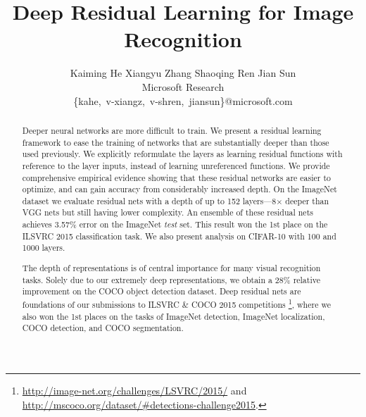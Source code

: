 \documentclass[10pt,twocolumn,letterpaper]{article}
\begin{document}
\title{Deep Residual Learning for Image Recognition}



\author{Kaiming He \qquad Xiangyu Zhang \qquad Shaoqing Ren \qquad Jian Sun \\
  \large Microsoft Research \vspace{-.2em}\\
  \normalsize
  \{kahe,~v-xiangz,~v-shren,~jiansun\}@microsoft.com
}

\maketitle

\begin{abstract}
  \vspace{-.5em}
  Deeper neural networks are more difficult to train. We present a residual learning framework to ease the training of networks that are substantially deeper than those used previously. We explicitly reformulate the layers as learning residual functions with reference to the layer inputs, instead of learning unreferenced functions. We provide comprehensive empirical evidence showing that these residual networks are easier to optimize, and can gain accuracy from considerably increased depth.
  On the ImageNet dataset we evaluate residual nets with a depth of up to 152 layers---8$\times$ deeper than VGG nets \cite{Simonyan2015} but still having lower complexity.
  An ensemble of these residual nets achieves 3.57\% error on the ImageNet \emph{test} set. This result won the 1st place on the ILSVRC 2015 classification task.
  We also present analysis on CIFAR-10 with 100 and 1000 layers.

  The depth of representations is of central importance for many visual recognition tasks. Solely due to our extremely deep representations, we obtain a 28\% relative improvement on the COCO object detection dataset. Deep residual nets are foundations of our submissions to ILSVRC \& COCO 2015 competitions
  \footnote{\fontsize{7.6pt}{1em}\selectfont \url{http://image-net.org/challenges/LSVRC/2015/} and
    \url{http://mscoco.org/dataset/\#detections-challenge2015}.},
  where we also won the 1st places on the tasks of ImageNet detection, ImageNet localization, COCO detection, and COCO segmentation.
\end{abstract}
\end{document}
